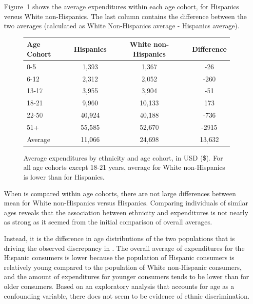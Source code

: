 Figure~\ref{ddsAvgExpEthAge} shows the average expenditures within each age cohort, for Hispanics versus White non-Hispanics. The last column contains the difference between the two averages (calculated as White Non-Hispanics average - Hispanics average).

\begin{figure}[ht]
	\centering
	\begin{tabular}{|l|c|c|c|}
		\hline
		Age Cohort & Hispanics & White non-Hispanics & Difference \\ 
		\hline
		0-5 & 1,393 & 1,367 & -26 \\ 
		6-12 & 2,312 & 2,052 & -260 \\ 
		13-17 & 3,955 & 3,904 & -51 \\ 
		\cellcolor{lightblue} 18-21 & \cellcolor{lightblue} 9,960 & \cellcolor{lightblue} 10,133 & \cellcolor{lightblue} 173 \\ 
		22-50 & 40,924 & 40,188 & -736 \\ 
		51+ & 55,585 & 52,670 & -2915 \\ 
		\hline
		Average & 11,066 & 24,698 & 13,632\\
		\hline
	\end{tabular}
	\caption{Average expenditures by ethnicity and age cohort, in USD (\$). For all age cohorts except 18-21 years, average  for White non-Hispanics is lower than for Hispanics.}
	\label{ddsAvgExpEthAge}
\end{figure}

When  is compared within age cohorts, there are not large differences between mean  for White non-Hispanics versus Hispanics. Comparing individuals of similar ages reveals that the association between ethnicity and expenditures is not nearly as strong as it seemed from the initial comparison of overall averages. 

\textD{\newpage}

Instead, it is the difference in age distributions of the two populations that is driving the observed discrepancy in . The overall average of expenditures for the Hispanic consumers is lower because the population of Hispanic consumers is relatively young compared to the population of White non-Hispanic consumers, and the amount of expenditures for younger consumers tends to be lower than for older consumers. Based on an exploratory analysis that accounts for age as a confounding variable, there does not seem to be evidence of ethnic discrimination. 

